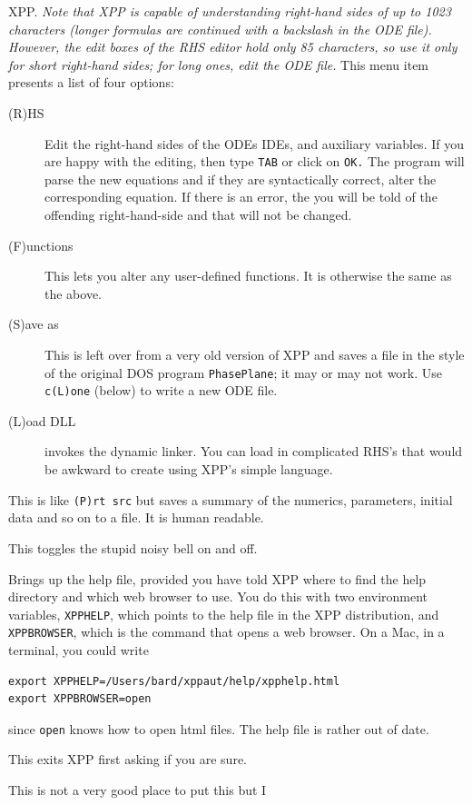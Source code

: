 \documentclass{article}
\begin{document}
\begin{description}
\begin{description}
XPP.  {\em Note that XPP is capable of understanding right-hand sides of up
to 1023 characters (longer formulas are continued with a backslash in the ODE file).  However, the
edit boxes of the RHS editor hold only 85 characters, so use it only for short right-hand sides; for
long ones, edit the ODE file.}  This menu item presents a
list of four options:
\begin{description}
\item[(R)HS] Edit the right-hand sides of the ODEs IDEs, and auxiliary
variables. If you are happy with the editing, then type {\tt TAB} or
click on {\tt OK.}  The program will parse the new equations and if
they are syntactically correct, alter the corresponding equation.  If
there is an error, the you will be told of the offending
right-hand-side and that will not be changed.  
\item[(F)unctions] This lets you alter any user-defined functions.  It
is otherwise the same as the above.
\item[(S)ave as] This is left over from a very old version of XPP and saves a
file in the style of the original DOS program {\tt PhasePlane}; it may or may not work.  Use
{\tt c(L)one} (below) to write a new ODE file.
\item[(L)oad DLL] invokes the dynamic linker. You can load in
complicated RHS's that would be awkward to create using XPP's simple
language. 
\end{description}
\item[(S)ave info] This is like {\tt (P)rt src} but saves a summary of the numerics, parameters, initial data and so on to
a file.  It is human readable.
\item[(B)ell on/off]  This toggles the stupid noisy bell on and off.
\item[(H)elp] Brings up the help file, provided you have told XPP where to find the help
directory and which web browser to use.  You do this with two environment variables, {\tt XPPHELP}, which
points to the help file in the XPP distribution, and {\tt XPPBROWSER}, which is the command that opens a web
browser.  On a Mac, in a terminal, you could write
\begin{verbatim}
export XPPHELP=/Users/bard/xppaut/help/xpphelp.html
export XPPBROWSER=open
\end{verbatim}
since {\tt open} knows how to open html files.  The help file is rather out of date.
\item[(Q)uit]  This exits XPP first asking if you are sure.
\item[ (T)ranspose ]  This is not a very good place to put this but I

\end{description}
\end{description}
\end{document}
